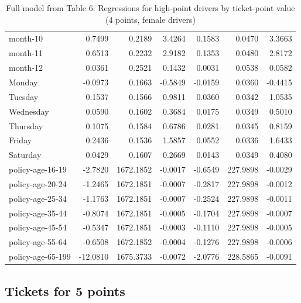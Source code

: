 \documentclass[10pt]{article}
\begin{document}
\begin{table}[ht]
\begin{tabular}{lrrrrrr}
  month-10 & 0.7499 & 0.2189 & 3.4264 & 0.1583 & 0.0470 & 3.3663 \\ 
  month-11 & 0.6513 & 0.2232 & 2.9182 & 0.1353 & 0.0480 & 2.8172 \\ 
  month-12 & 0.0361 & 0.2521 & 0.1432 & 0.0031 & 0.0538 & 0.0582 \\ 
  Monday & -0.0973 & 0.1663 & -0.5849 & -0.0159 & 0.0360 & -0.4415 \\ 
  Tuesday & 0.1537 & 0.1566 & 0.9811 & 0.0360 & 0.0342 & 1.0535 \\ 
  Wednesday & 0.0590 & 0.1602 & 0.3684 & 0.0175 & 0.0349 & 0.5010 \\ 
  Thursday & 0.1075 & 0.1584 & 0.6786 & 0.0281 & 0.0345 & 0.8159 \\ 
  Friday & 0.2436 & 0.1536 & 1.5857 & 0.0552 & 0.0336 & 1.6433 \\ 
  Saturday & 0.0429 & 0.1607 & 0.2669 & 0.0143 & 0.0349 & 0.4080 \\ 
  policy-age-16-19 & -2.7820 & 1672.1852 & -0.0017 & -0.6549 & 227.9898 & -0.0029 \\ 
  policy-age-20-24 & -1.2465 & 1672.1851 & -0.0007 & -0.2817 & 227.9898 & -0.0012 \\ 
  policy-age-25-34 & -1.1763 & 1672.1851 & -0.0007 & -0.2524 & 227.9898 & -0.0011 \\ 
  policy-age-35-44 & -0.8074 & 1672.1851 & -0.0005 & -0.1704 & 227.9898 & -0.0007 \\ 
  policy-age-45-54 & -0.5347 & 1672.1851 & -0.0003 & -0.1110 & 227.9898 & -0.0005 \\ 
  policy-age-55-64 & -0.6508 & 1672.1852 & -0.0004 & -0.1276 & 227.9898 & -0.0006 \\ 
  policy-age-65-199 & -12.0810 & 1675.3733 & -0.0072 & -2.0776 & 228.5865 & -0.0091 \\ 
   \hline
\end{tabular}
\caption{Full model from Table 6: Regressions for high-point drivers by ticket-point value (4 points, female drivers)} 
\label{tab_6_4_pts_F}
\end{table}


\clearpage
\pagebreak




\subsection{Tickets for 5 points}
\end{document}
